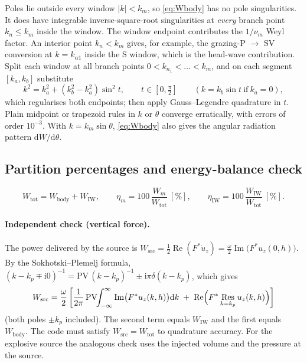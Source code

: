 \documentclass[11pt,a4paper]{article}
\newcommand{\ii}{\mathrm{i}}
\newcommand{\dd}{\mathrm{d}}
\newcommand{\Res}{\operatorname*{Res}}
\newcommand{\RE}{\operatorname{Re}}
\newcommand{\IM}{\operatorname{Im}}
\begin{document}
Poles lie outside every window $|k|<k_m$, so \eqref{eq:Wbody} has no pole singularities. It does
have integrable inverse-square-root singularities at \emph{every} branch point $k_n\le k_m$ inside the
window. The window endpoint contributes the $1/\nu_m$ Weyl factor. An interior point $k_n<k_m$ gives,
for example, the grazing-P $\to$ SV conversion at $k=k_{\alpha1}$ inside the S window, which is the
head-wave contribution. Split each window at all branch points $0<k_{n_1}<\dots<k_m$, and on each
segment $[k_a,k_b]$ substitute
\begin{equation}
  k^2=k_a^2+(k_b^2-k_a^2)\sin^2 t,\qquad t\in[0,\tfrac{\pi}{2}]
  \qquad(k=k_b\sin t\ \text{if}\ k_a=0),
  \label{eq:subst}
\end{equation}
which regularises both endpoints; then apply Gauss--Legendre quadrature in $t$. Plain midpoint
or trapezoid rules in $k$ or $\theta$ converge erratically, with errors of order $10^{-3}$. With
$k=k_m\sin\theta$, \eqref{eq:Wbody} also gives the angular radiation pattern $\dd W/\dd\theta$.

\subsection{Partition percentages and energy-balance check}

\begin{equation}
  W_{\mathrm{tot}}=W_{\mathrm{body}}+W_{\mathrm{IW}},\qquad
  \eta_m=100\,\frac{W_m}{W_{\mathrm{tot}}}\ [\%],\qquad
  \eta_{\mathrm{IW}}=100\,\frac{W_{\mathrm{IW}}}{W_{\mathrm{tot}}}\ [\%].
\end{equation}
\paragraph{Independent check (vertical force).} The power delivered by the source is
$W_{\mathrm{src}}=\tfrac12\RE(F^{*}\dot u_z)=\tfrac{\omega}{2}\IM\bigl(F^{*}u_z(0,h)\bigr)$.
By the Sokhotski--Plemelj formula, $(k-k_p\mp\ii0)^{-1}=\mathrm{PV}\,(k-k_p)^{-1}\pm\ii\pi\delta(k-k_p)$,
which gives
\begin{equation}
  W_{\mathrm{src}}=\frac{\omega}{2}\left[\frac{1}{2\pi}\,\mathrm{PV}\!\!\int_{-\infty}^{\infty}
  \IM\bigl(F^{*}u_z(k,h)\bigr)\dd k
  \;+\;\RE\Bigl(F^{*}\Res_{k=k_p}u_z(k,h)\Bigr)\right]
  \label{eq:Wsrc}
\end{equation}
(both poles $\pm k_p$ included). The second term equals $W_{\mathrm{IW}}$ and the first equals
$W_{\mathrm{body}}$. The code must satisfy $W_{\mathrm{src}}=W_{\mathrm{tot}}$ to quadrature accuracy.
For the explosive source the analogous check uses the injected volume and the pressure at the source.
\end{document}
